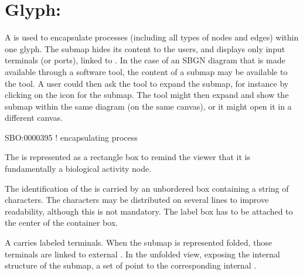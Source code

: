 \section{Glyph: }
\label{sec:submap}

A  is used to encapsulate processes (including all types of nodes and edges) within one glyph.  The submap hides its content to the users, and displays only input terminals (or ports), linked to . In the case of an SBGN diagram that is made available through a software tool, the content of a submap may be available to the tool.  A user could then ask the tool to expand the submap, for instance by clicking on the icon for the submap.  The tool might then expand and show the submap within the same diagram (on the same canvas), or it might open it in a different canvas.

\begin{glyphDescription}

\glyphSboTerm SBO:0000395 ! encapsulating process

\glyphContainer The  is represented as a rectangle box to remind the viewer that it is fundamentally a biological activity node.

\glyphLabel The identification of the  is carried by an unbordered box containing a string of characters.  The characters may be distributed on several lines to improve readability, although this is not mandatory.  The label box has to be attached to the center of the container box.

\glyphAux A  carries labeled terminals.  When the submap is represented folded, those terminals are linked to external .  In the unfolded view, exposing the internal structure of the submap, a set of  point to the corresponding internal .

\end{glyphDescription}

